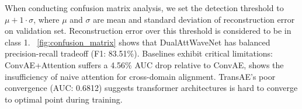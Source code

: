 \documentclass[10pt, conference]{IEEEtran}
\begin{document}


When conducting confusion matrix analysis, we set the detection threshold to $\mu + 1 \cdot \sigma$, where $\mu$ and $\sigma$ are mean and standard deviation of reconstruction error on validation set.  Reconstruction error over this threshold is considered to be in class 1. \figurename~\ref{fig:confusion_matrix} shows that DualAttWaveNet has balanced precision-recall tradeoff (F1: 83.51\%). Baselines exhibit critical limitations: ConvAE+Attention suffers a 4.56\% AUC drop relative to ConvAE, shows  the insufficiency of naive attention for cross-domain alignment. TransAE’s poor convergence (AUC: 0.6812) suggests transformer architectures is hard to converge to optimal point during training.
\end{document}
